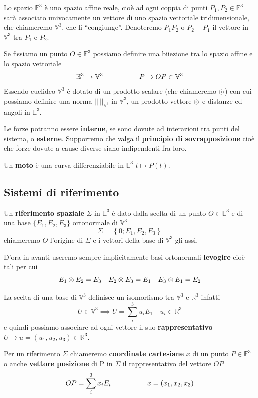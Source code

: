 \documentclass[11pt,a4paper,twoside]{book}
\theoremstyle{esss}
\theoremstyle{dotless}
\numberwithin{equation}{section} %
\begin{document}
Lo spazio $\mathbb{E}^3$ è uno spazio affine reale, cioè ad ogni coppia di punti $P_1,P_2\in\mathbb{E}^3$ sarà associato univocamente un vettore di uno spazio vettoriale tridimensionale, che chiameremo $\mathbb{V}^3$, che li ``congiunge''.
Denoteremo $P_1P_2$ o $P_2-P_1$ il vettore in $\mathbb{V}^3$ tra $P_1$ e $P_2$.

Se fissiamo un punto $O\in\mathbb{E}^3$ possiamo definire una biiezione tra lo spazio affine e lo spazio vettoriale
\[
\mathbb{E}^3\rightarrow\mathbb{V}^3 \hspace{0.15\linewidth} P\mapsto OP\in\mathbb{V}^3
\]
Essendo euclideo $\mathbb{V}^3$ è dotato di un prodotto scalare (che chiameremo $\odot$) con cui possiamo definire una norma $\left|\left| \> \right|\right|_{\mathbb{V}^3}$ in $\mathbb{V}^3$, un prodotto vettore $\otimes$ e distanze ed angoli in $\mathbb{E}^3$.


Le forze potranno essere \textbf{interne}, se sono dovute ad interazioni tra punti del sistema, o \textbf{esterne}. Supporremo che valga il \textbf{principio di sovrapposizione} cioè che forze dovute a cause diverse siano indipendenti fra loro.

Un \textbf{moto} è una curva differenziabile in $\mathbb{E}^3$ $t\mapsto P(t)$.


\subsection{Sistemi di riferimento}

Un \textbf{riferimento spaziale} $\Sigma$ in $\mathbb{E}^3$ è dato dalla scelta di un punto $O\in\mathbb{E}^3$ e di una base $\{E_1,E_2,E_3\}$ ortonormale di $\mathbb{V}^3$
\[
\Sigma = \left\{ 0 ; E_1,E_2,E_3 \right\}
\]
chiameremo $O$ l'origine di $\Sigma$ e i vettori della base di $\mathbb{V}^3$ gli assi.

D'ora in avanti useremo sempre implicitamente basi ortonormali \textbf{levogire} cioè tali per cui
\begin{equation}
E_1\otimes E_2 =E_3  \quad E_2\otimes E_3 = E_1 \quad E_3\otimes E_1=E_2
\end{equation}

La scelta di una base di $\mathbb{V}^3$ definisce un isomorfismo tra $\mathbb{V}^3$ e $\mathbb{R}^3$ infatti
\[
U\in\mathbb{V}^3 \implies U=\sum_i^3 u_i E_1 \quad u_i\in\mathbb{R}^3
\]
e quindi possiamo associare ad ogni vettore il suo \textbf{rappresentativo} $U\mapsto u=(u_1,u_2,u_3)\in\mathbb{R}^3$.

Per un riferimento $\Sigma$ chiameremo \textbf{coordinate cartesiane} $x$ di un punto $P\in\mathbb{E}^3$ o anche \textbf{vettore posizione} di P in $\Sigma$ il rappresentativo del vettore $OP$
\[
OP=\sum_i^3 x_iE_i \hspace{0.15\linewidth} x=(x_1,x_2,x_3)
\]
\end{document}

